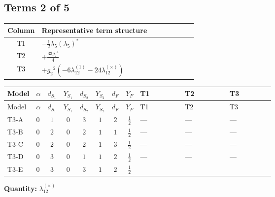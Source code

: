 \documentclass[8pt]{article}
\begin{document}
\begin{landscape}
\subsection*{Terms 2 of 5}
\begin{center}
\begin{tabular}{@{}c >{\raggedright\arraybackslash}p{0.82\linewidth}@{}}
\toprule
Column & Representative term structure \\
\midrule
T1 & \(\displaystyle -\frac{1}{2} {\lambda_5} \left({\lambda_5}\right)^{*}\) \\
\midrule
T2 & \(\displaystyle +\frac{33 {g_2}^4}{4}\) \\
\midrule
T3 & \(\displaystyle +{g_2}^2 (-6 {\lambda_{12}^{(1)}}-24 {\lambda_{12}^{(\times)}})\) \\
\midrule
\bottomrule
\end{tabular}
\end{center}
\smallskip
\tiny
\begin{longtable}{@{}llcccccc >{\raggedright\arraybackslash}p{0.21\linewidth} >{\raggedright\arraybackslash}p{0.21\linewidth} >{\raggedright\arraybackslash}p{0.21\linewidth}@{}}
\toprule
Model & $\alpha$ & $d_{S_1}$ & $Y_{S_1}$ & $d_{S_2}$ & $Y_{S_2}$ & $d_F$ & $Y_F$ & T1 & T2 & T3 \\
\midrule
\endfirsthead
\toprule
Model & $\alpha$ & $d_{S_1}$ & $Y_{S_1}$ & $d_{S_2}$ & $Y_{S_2}$ & $d_F$ & $Y_F$ & T1 & T2 & T3 \\
\midrule
\endhead
T3-A & $0$ & $1$ & $0$ & $3$ & $1$ & $2$ & $\frac{1}{2}$ & --- & --- & --- \\
\midrule
T3-B & $0$ & $2$ & $0$ & $2$ & $1$ & $1$ & $\frac{1}{2}$ & --- & --- & --- \\
\midrule
T3-C & $0$ & $2$ & $0$ & $2$ & $1$ & $3$ & $\frac{1}{2}$ & --- & --- & --- \\
\midrule
T3-D & $0$ & $3$ & $0$ & $1$ & $1$ & $2$ & $\frac{1}{2}$ & --- & --- & --- \\
\midrule
T3-E & $0$ & $3$ & $0$ & $3$ & $1$ & $2$ & $\frac{1}{2}$ & \scriptsize\adjustbox{max width=\linewidth}{$\begin{gathered} -\frac{1}{2} {\lambda_5} \left({\lambda_5}\right)^{*}\end{gathered}$} & \scriptsize\adjustbox{max width=\linewidth}{$\begin{gathered} +\frac{33 {g_2}^4}{4}\end{gathered}$} & \scriptsize\adjustbox{max width=\linewidth}{$\begin{gathered} +{g_2}^2 (-6 {\lambda_{12}^{(1)}}-24 {\lambda_{12}^{(\times)}})\end{gathered}$} \\
\midrule
\bottomrule
\end{longtable}
\clearpage
\noindent\textbf{Quantity: }$\lambda_{12}^{(\times)}$\par\smallskip

\end{landscape}
\end{document}
